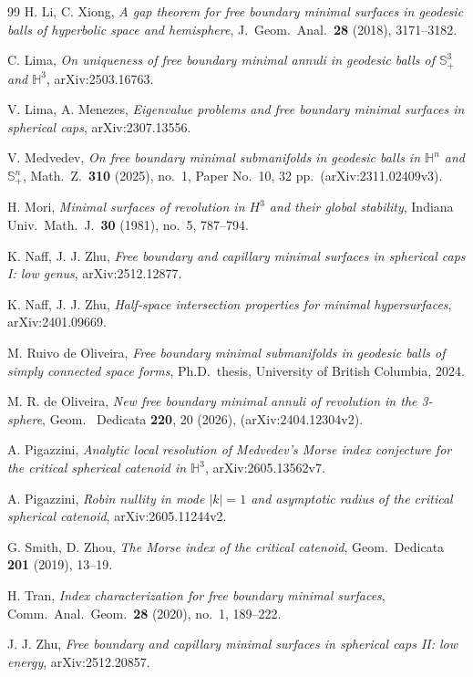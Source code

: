 \documentclass[11pt,a4paper]{amsart}
\theoremstyle{plain}
\theoremstyle{definition}
\newcommand{\Sph}{\mathbb{S}}
\newcommand{\Hyp}{\mathbb{H}}
\begin{document}
\begin{thebibliography}{99}
 H. Li, C. Xiong, \emph{A gap theorem for free boundary minimal surfaces in geodesic balls of hyperbolic space and hemisphere}, J.\ Geom.\ Anal.\ \textbf{28} (2018), 3171--3182.

 C. Lima, \emph{On uniqueness of free boundary minimal annuli in geodesic balls of $\Sph^3_+$ and $\Hyp^3$}, arXiv:2503.16763.

 V. Lima, A. Menezes, \emph{Eigenvalue problems and free boundary minimal surfaces in spherical caps}, arXiv:2307.13556.

 V. Medvedev, \emph{On free boundary minimal submanifolds in geodesic balls in $\Hyp^n$ and $\Sph^n_+$}, Math.\ Z.\ \textbf{310} (2025), no.\ 1, Paper No.\ 10, 32 pp.\ (arXiv:2311.02409v3).

 H. Mori, \emph{Minimal surfaces of revolution in $H^3$ and their global stability}, Indiana Univ.\ Math.\ J.\ \textbf{30} (1981), no.\ 5, 787--794.

 K. Naff, J. J. Zhu, \emph{Free boundary and capillary minimal surfaces in spherical caps I: low genus}, arXiv:2512.12877.

 K. Naff, J. J. Zhu, \emph{Half-space intersection properties for minimal hypersurfaces}, arXiv:2401.09669.

 M. Ruivo de Oliveira, \emph{Free boundary minimal submanifolds in geodesic balls of simply connected space forms}, Ph.D.\ thesis, University of British Columbia, 2024.

 M. R. de Oliveira, \emph{New free boundary minimal annuli of revolution in the 3-sphere}, Geom. \ Dedicata \textbf{220}, 20 (2026), (arXiv:2404.12304v2).

 A. Pigazzini, \emph{Analytic local resolution of Medvedev's Morse index conjecture for the critical spherical catenoid in $\Hyp^3$}, arXiv:2605.13562v7.

 A. Pigazzini, \emph{Robin nullity in mode $|k|=1$ and asymptotic radius of the critical spherical catenoid}, arXiv:2605.11244v2.

 G. Smith, D. Zhou, \emph{The Morse index of the critical catenoid}, Geom.\ Dedicata \textbf{201} (2019), 13--19.

 H. Tran, \emph{Index characterization for free boundary minimal surfaces}, Comm.\ Anal.\ Geom.\ \textbf{28} (2020), no.\ 1, 189--222.

 J. J. Zhu, \emph{Free boundary and capillary minimal surfaces in spherical caps II: low energy}, arXiv:2512.20857.

\end{thebibliography}
\end{document}
